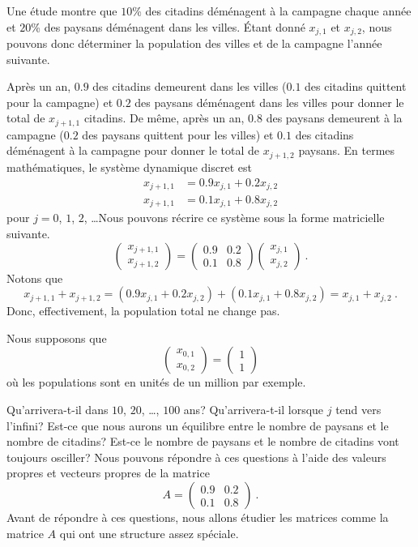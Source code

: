 {\begin{egg}
Une étude montre que $10$\% des citadins déménagent à la campagne
chaque année et $20$\% des paysans déménagent dans les villes.  Étant
donné $x_{j,1}$ et $x_{j,2}$, nous pouvons donc déterminer la population
des villes et de la campagne l'année suivante.

Après un an, $0.9$ des citadins demeurent dans les villes ($0.1$ des
citadins quittent pour la campagne) et $0.2$ des paysans déménagent
dans les villes pour donner le total de $x_{j+1,1}$ citadins.  De même,
après un an, $0.8$ des paysans demeurent à la campagne ($0.2$ des
paysans quittent pour les villes) et $0.1$ des citadins déménagent à
la campagne pour donner le total de $x_{j+1,2}$ paysans.  En termes
mathématiques, le système dynamique discret est
\begin{align*}
x_{j+1,1} &= 0.9 x_{j,1} + 0.2 x_{j,2} \\
x_{j+1,1} &= 0.1 x_{j,1} + 0.8 x_{j,2}  
\end{align*}
pour $j=0$, $1$, $2$, \ldots\quad Nous pouvons récrire ce système sous la
forme matricielle suivante.
\[
\begin{pmatrix} x_{j+1,1} \\ x_{j+1,2} \end{pmatrix} =
\begin{pmatrix} 0.9 & 0.2 \\ 0.1 & 0.8 \end{pmatrix}
\begin{pmatrix} x_{j,1} \\ x_{j,2} \end{pmatrix} \ .
\]
Notons que
\[
  x_{j+1,1} + x_{j+1,2} = (0.9 x_{j,1} + 0.2 x_{j,2}) + (0.1x_{j,1} + 0.8x_{j,2})
  = x_{j,1} + x_{j,2}  \ .
\]
Donc, effectivement, la population total ne change pas.

Nous supposons que
\[
\begin{pmatrix} x_{0,1} \\ x_{0,2} \end{pmatrix} =
\begin{pmatrix} 1 \\ 1 \end{pmatrix}
\]
où les populations sont en unités de un million par exemple.

Qu'arrivera-t-il dans $10$, $20$, \ldots, $100$ ans?  Qu'arrivera-t-il
lorsque $j$ tend vers l'infini?  Est-ce que nous aurons un équilibre entre
le nombre de paysans et le nombre de citadins? Est-ce le nombre de
paysans et le nombre de citadins vont toujours osciller? Nous pouvons
répondre à ces questions à l'aide des valeurs propres et vecteurs
propres de la matrice
\[
A = \begin{pmatrix} 0.9 & 0.2 \\ 0.1 & 0.8 \end{pmatrix} \ .
\]
Avant de répondre à ces questions, nous allons étudier les matrices
comme la matrice $A$ qui ont une structure assez spéciale.
\label{alglinMRKV}
\end{egg}

}
